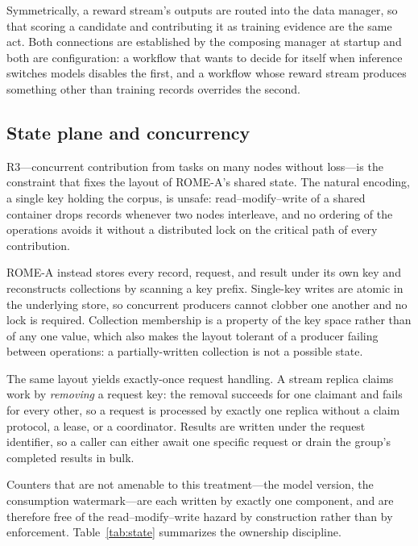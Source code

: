 Symmetrically, a reward stream's outputs are routed into the data manager, so
that scoring a candidate and contributing it as training evidence are the same
act. Both connections are established by the composing manager at startup and
both are configuration: a workflow that wants to decide for itself when
inference switches models disables the first, and a workflow whose reward stream
produces something other than training records overrides the second.

\subsection{State plane and concurrency}
\label{sec:design:state}

R3---concurrent contribution from tasks on many nodes without loss---is the
constraint that fixes the layout of ROME-A's shared state. The natural encoding,
a single key holding the corpus, is unsafe: read--modify--write of a shared
container drops records whenever two nodes interleave, and no ordering of the
operations avoids it without a distributed lock on the critical path of every
contribution.

ROME-A instead stores every record, request, and result under its own key and
reconstructs collections by scanning a key prefix. Single-key writes are atomic
in the underlying store, so concurrent producers cannot clobber one another and
no lock is required. Collection membership is a property of the key space rather
than of any one value, which also makes the layout tolerant of a producer
failing between operations: a partially-written collection is not a possible
state.

The same layout yields exactly-once request handling. A stream replica claims
work by \emph{removing} a request key: the removal succeeds for one claimant and
fails for every other, so a request is processed by exactly one replica without a
claim protocol, a lease, or a coordinator. Results are written under the request
identifier, so a caller can either await one specific request or drain the
group's completed results in bulk.

Counters that are not amenable to this treatment---the model version, the
consumption watermark---are each written by exactly one component, and are
therefore free of the read--modify--write hazard by construction rather than by
enforcement. Table~\ref{tab:state} summarizes the ownership discipline.

